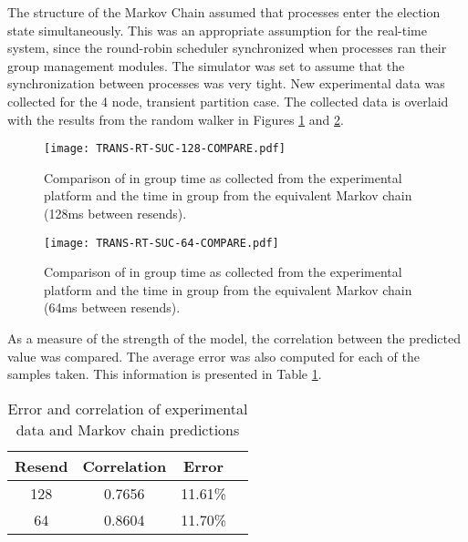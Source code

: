 The structure of the Markov Chain assumed that processes enter the election state simultaneously.
This was an appropriate assumption for the real-time system, since the round-robin scheduler synchronized when processes ran their group management modules.
The simulator was set to assume that the synchronization between processes was very tight.
New experimental data was collected for the 4 node, transient partition case.
The collected data is overlaid with the results from the random walker in Figures \ref{fig:COMPARE-SUC-TRANS-RT-128} and \ref{fig:COMPARE-SUC-TRANS-RT-64}.

\begin{figure}[!h]
\centering
\texttt{[image: TRANS-RT-SUC-128-COMPARE.pdf]}

\caption{Comparison of in group time as collected from the experimental platform and the time in group from the equivalent Markov chain (128ms between resends).}
\label{fig:COMPARE-SUC-TRANS-RT-128}
\end{figure}

\begin{figure}[!h]
\centering
\texttt{[image: TRANS-RT-SUC-64-COMPARE.pdf]}

\caption{Comparison of in group time as collected from the experimental platform and the time in group from the equivalent Markov chain (64ms between resends).}
\label{fig:COMPARE-SUC-TRANS-RT-64}
\end{figure}

As a measure of the strength of the model, the correlation between the predicted value was compared.
The average error was also computed for each of the samples taken.
This information is presented in Table \ref{tab:STAT-DATA}.

\begin{table}
\caption{Error and correlation of experimental data and Markov chain predictions}
\label{tab:STAT-DATA}
\centering
\begin{tabular}{|c||c|c|c|} 
\hline
Resend & Correlation & Error \\ \hline
128 & 0.7656 & 11.61\% \\ \hline
64 & 0.8604 & 11.70\% \\ \hline 
\end{tabular}
\end{table}

